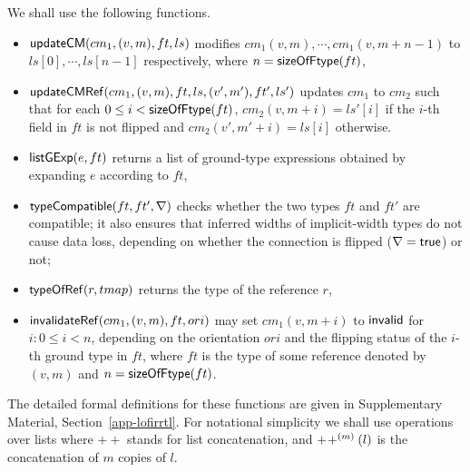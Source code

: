 We shall use the following functions. %

\begin{itemize}
	\item ${\sf updateCM}(cm_1, (v, m), ft, ls)$ modifies $cm_1(v, m), \cdots, cm_1(v, m+n-1)$ to $ls[0], \cdots, ls[n-1]$ respectively, where $n = {\sf sizeOfFtype}(ft)$,
	\item ${\sf updateCMRef}(cm_1, (v, m), ft, ls, (v', m'), ft', ls')$ updates $cm_1$ to $cm_2$ such that for each $0 \le i < {\sf sizeOfFtype}(ft)$, $cm_2(v, m+i) = ls'[i]$ if the $i$-th field in $ft$ is not flipped and $cm_2(v', m'+i) = ls[i]$ otherwise.
	\item ${\sf listGExp}(e, ft)$ returns a list of ground-type expressions obtained by expanding $e$ according to $ft$,
	\item ${\sf typeCompatible}(ft, ft', \nabla)$ checks whether the two types $ft$ and $ft'$ are compatible; %
	it also ensures that inferred widths of implicit-width types do not cause data loss,
	depending on whether the connection is flipped ($\nabla = {\sf true}$) or not;
	\item ${\sf typeOfRef}(r, tmap)$ returns the type of the reference $r$,
	\item ${\sf invalidateRef}(cm_1, (v, m), ft, ori)$ may set $cm_1(v, m+i)$ to ${\sf invalid}$ for $i: 0 \le i < n$, depending on the orientation $ori$ and the flipping status of the $i$-th ground type in $ft$, where $ft$ is the type of some reference denoted by $(v, m)$ and $n = {\sf sizeOfFtype}(ft)$.
\end{itemize}
The detailed formal definitions for these functions are given in Supplementary Material, Section~\ref{app-lofirrtl}.
%
For notational simplicity we shall use operations over lists where $++$ stands for list concatenation, and $+\!+^{(m)}(l)$ is the concatenation of $m$ copies of $l$.

